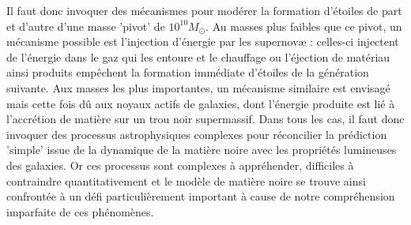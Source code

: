 Il faut donc invoquer des mécanismes pour modérer la formation d'étoiles de part et d'autre d'une masse 'pivot' de $10^{10} M_\odot$. Au masses plus faibles que ce pivot, un mécanisme possible est l'injection d'énergie par les supernovæ : celles-ci injectent de l'énergie dans le gaz qui les entoure et le chauffage ou l'éjection de matériau ainsi produits empêchent la formation immédiate d'étoiles de la génération suivante. Aux masses les plus importantes, un mécanisme similaire est envisagé mais cette fois dû aux noyaux actifs de galaxies, dont l'énergie produite est lié à l'accrétion de matière sur un trou noir supermassif. Dans tous les cas, il faut donc invoquer des processus astrophysiques complexes pour réconcilier la prédiction 'simple' issue de la dynamique de la matière noire avec les propriétés lumineuses des galaxies. Or ces processus sont complexes à appréhender, difficiles à contraindre quantitativement et le modèle de matière noire se trouve ainsi confrontée à un défi particulièrement important à cause de notre compréhension imparfaite de ces phénomènes.

